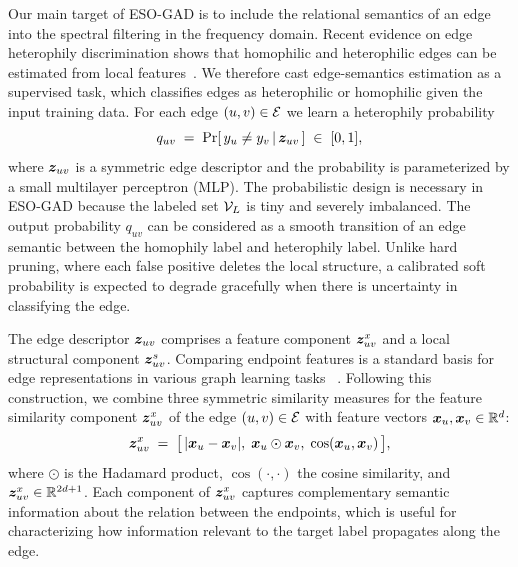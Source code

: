 Our main target of ESO-GAD is to include the relational semantics of an edge into the spectral filtering in the frequency domain.
Recent evidence on edge heterophily discrimination shows
that homophilic and heterophilic edges can be estimated from local features~\citep{GREET, H2-FDetector}.
We therefore cast edge-semantics estimation as a supervised task, which classifies edges as heterophilic or homophilic given the input training data.
For each edge $(u,v)\in\mathcal{E}$ we learn a heterophily probability
\begin{equation}
  q_{uv} \;=\; \Pr\!\left[\, y_u \neq y_v \,\middle|\, \bm{z}_{uv} \,\right]
  \;\in\; [0,1],
  \label{eq:quv}
\end{equation}
where $\bm{z}_{uv}$ is a symmetric edge descriptor and the probability is parameterized by a small multilayer perceptron (MLP).
The probabilistic design is necessary in ESO-GAD because the labeled set $\mathcal{V}_L$ is tiny and severely imbalanced.
The output probability $q_{uv}$ can be considered as a smooth transition of an edge semantic between the homophily label and heterophily label.
Unlike hard pruning, where each false positive deletes the local structure, a calibrated soft probability is expected to degrade gracefully when there is uncertainty in classifying the edge.

The edge descriptor $\bm{z}_{uv}$ comprises a feature component $\bm{z}^{x}_{uv}$ and a local structural component $\bm{z}^{s}_{uv}$.
Comparing endpoint features is a standard basis for edge representations in various graph learning tasks ~\citep{node2vec,
CARE-GNN, GREET}.
Following this construction, we combine three symmetric similarity measures for the feature similarity component $\bm{z}^{x}_{uv}$ of the edge $(u,v)\in\mathcal{E}$ with feature vectors $\bm{x}_u, \bm{x}_v \in \mathbb{R}^{d}$:
\begin{equation}
  \bm{z}^{x}_{uv} \;=\;
  \bigl[\, |\bm{x}_u-\bm{x}_v|,\; \bm{x}_u\odot\bm{x}_v,\; \cos(\bm{x}_u,\bm{x}_v) \,\bigr],
  \label{eq:zfeature}
\end{equation}
where $\odot$ is the Hadamard product, $\cos(\cdot,\cdot)$ the cosine similarity, and
$\bm{z}^{x}_{uv}\in\mathbb{R}^{2d+1}$.
Each component of $\bm{z}^{x}_{uv}$ captures complementary semantic information about the relation between the endpoints, which is useful for characterizing how information relevant to the target label propagates along the edge.

